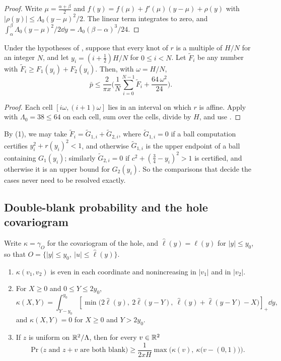 \documentclass[11pt,colorlinks]{charlie}
\newcommand{\pos}[1]{\left[#1\right]_+}
\begin{document}
\begin{proof}
Write $\mu=\tfrac{\alpha+\beta}2$ and $f(y)=f(\mu)+f'(\mu)(y-\mu)+\rho(y)$ with $|\rho(y)|\le\Lambda_0(y-\mu)^2/2$. The linear term integrates to zero, and $\int_\alpha^\beta\Lambda_0(y-\mu)^2/2\dd y=\Lambda_0(\beta-\alpha)^3/24$.
\end{proof}

\begin{corollary}\label{cor:heightquad}
Under the hypotheses of , suppose that every knot of $r$ is a multiple of $H/N$ for an integer $N$, and let $y_i=(i+\tfrac12)H/N$ for $0\le i<N$. Let $\tilde F_i$ be any number with $\tilde F_i\ge F_1(y_i)+F_2(y_i)$. Then, with $\omega=H/N$,
\[
 \bar p\le\frac{2}{\pi x}\Big(\frac1N\sum_{i=0}^{N-1}\tilde F_i+\frac{64\,\omega^2}{24}\Big).
\]
\end{corollary}

\begin{proof}
Each cell $[i\omega,(i+1)\omega]$ lies in an interval on which $r$ is affine. Apply  with $\Lambda_0=38\le64$ on each cell, sum over the cells, divide by $H$, and use .
\end{proof}

By (1), we may take $\tilde F_i=\tilde G_{1,i}+\tilde G_{2,i}$, where $\tilde G_{1,i}=0$ if a ball computation certifies $y_i^2+r(y_i)^2<1$, and otherwise $\tilde G_{1,i}$ is the upper endpoint of a ball containing $G_1(y_i)$; similarly $\tilde G_{2,i}=0$ if $c^2+(\tfrac34-y_i)^2>1$ is certified, and otherwise it is an upper bound for $G_2(y_i)$. So the comparisons that decide the cases never need to be resolved exactly.

\subsection{Double-blank probability and the hole covariogram}
Write $\kappa=\gamma_O$ for the covariogram of the hole, and $\hat\ell(y)=\ell(y)$ for $|y|\le y_0$, so that $O=\{|y|\le y_0,\ |u|\le\hat\ell(y)\}$.

\begin{lemma}\label{lem:kappa}
\begin{enumerate}
\item $\kappa(v_1,v_2)$ is even in each coordinate and nonincreasing in $|v_1|$ and in $|v_2|$.
\item For $X\ge0$ and $0\le Y\le2y_0$,
\[
 \kappa(X,Y)=\int_{Y-y_0}^{y_0}\pos{\min\big(2\hat\ell(y),\ 2\hat\ell(y-Y),\ \hat\ell(y)+\hat\ell(y-Y)-X\big)}\dd y ,
\]
and $\kappa(X,Y)=0$ for $X\ge0$ and $Y>2y_0$.
\item If $z$ is uniform on $\mathbb{R}^2/\Lambda$, then for every $v\in\mathbb{R}^2$
\[
 \Pr\big(z\text{ and }z+v\text{ are both blank}\big)\ge\frac{1}{2xH}\max\Big(\kappa(v),\ \kappa\big(v-(0,1)\big)\Big).
\]
\end{enumerate}
\end{lemma}
\end{document}
